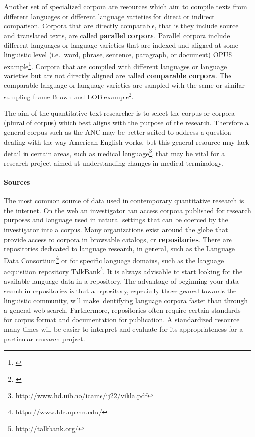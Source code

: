 \documentclass[
]{article}
\DeclareRobustCommand{\href}[2]{#2\footnote{\url{#1}}}
\begin{document}
Another set of specialized corpora are resources which aim to compile texts from different languages or different language varieties for direct or indirect comparison. Corpora that are directly comparable, that is they include source and translated texts, are called \textbf{parallel corpora}. Parallel corpora include different languages or language varieties that are indexed and aligned at some linguistic level (i.e.~word, phrase, sentence, paragraph, or document) \href{}{OPUS example}. Corpora that are compiled with different languages or language varieties but are not directly aligned are called \textbf{comparable corpora}. The comparable language or language varieties are sampled with the same or similar sampling frame \href{}{Brown and LOB example}.

The aim of the quantitative text researcher is to select the corpus or corpora (plural of corpus) which best aligns with the purpose of the research. Therefore a general corpus such as the ANC may be better suited to address a question dealing with the way American English works, but this general resource may lack detail in certain areas, such as \href{http://www.hd.uib.no/icame/ij22/vihla.pdf}{medical language}, that may be vital for a research project aimed at understanding changes in medical terminology.

\hypertarget{sources}{%
\paragraph{Sources}\label{sources}}

The most common source of data used in contemporary quantitative research is the internet. On the web an investigator can access corpora published for research purposes and language used in natural settings that can be coerced by the investigator into a corpus. Many organizations exist around the globe that provide access to corpora in browsable catalogs, or \textbf{repositories}. There are repositories dedicated to language research, in general, such as the \href{https://www.ldc.upenn.edu/}{Language Data Consortium} or for specific language domains, such as the language acquisition repository \href{http://talkbank.org/}{TalkBank}. It is always advisable to start looking for the available language data in a repository. The advantage of beginning your data search in repositories is that a repository, especially those geared towards the linguistic community, will make identifying language corpora faster than through a general web search. Furthermore, repositories often require certain standards for corpus format and documentation for publication. A standardized resource many times will be easier to interpret and evaluate for its appropriateness for a particular research project.
\end{document}

